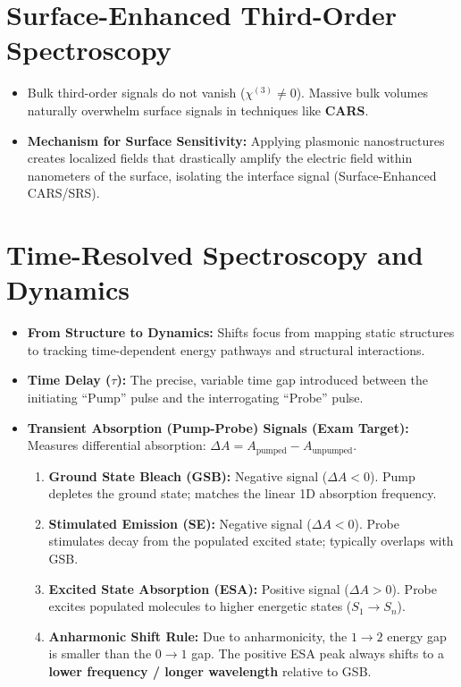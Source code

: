 \section{Surface-Enhanced Third-Order Spectroscopy}

\begin{itemize}
  \item Bulk third-order signals do not vanish ($\chi^{(3)}\neq 0$). Massive bulk volumes naturally overwhelm surface signals in techniques like \textbf{CARS}.
  \item \textbf{Mechanism for Surface Sensitivity:} Applying plasmonic nanostructures creates localized fields that drastically amplify the electric field within nanometers of the surface, isolating the interface signal (Surface-Enhanced CARS/SRS).
\end{itemize}

\section{Time-Resolved Spectroscopy and Dynamics}

\begin{itemize}
  \item \textbf{From Structure to Dynamics:} Shifts focus from mapping static structures to tracking time-dependent energy pathways and structural interactions.
  \item \textbf{Time Delay ($\tau$):} The precise, variable time gap introduced between the initiating ``Pump'' pulse and the interrogating ``Probe'' pulse.
  \item \textbf{Transient Absorption (Pump-Probe) Signals (Exam Target):}
  Measures differential absorption: $\Delta A = A_\text{pumped} - A_\text{unpumped}$.
  \begin{enumerate}
    \item \textbf{Ground State Bleach (GSB):} Negative signal ($\Delta A < 0$). Pump depletes the ground state; matches the linear 1D absorption frequency.
    \item \textbf{Stimulated Emission (SE):} Negative signal ($\Delta A < 0$). Probe stimulates decay from the populated excited state; typically overlaps with GSB.
    \item \textbf{Excited State Absorption (ESA):} Positive signal ($\Delta A > 0$). Probe excites populated molecules to higher energetic states ($S_1 \rightarrow S_n$).
    \item \textbf{Anharmonic Shift Rule:} Due to anharmonicity, the $1 \rightarrow 2$ energy gap is smaller than the $0 \rightarrow 1$ gap. The positive ESA peak always shifts to a \textbf{lower frequency / longer wavelength} relative to GSB.
  \end{enumerate}
\end{itemize}

